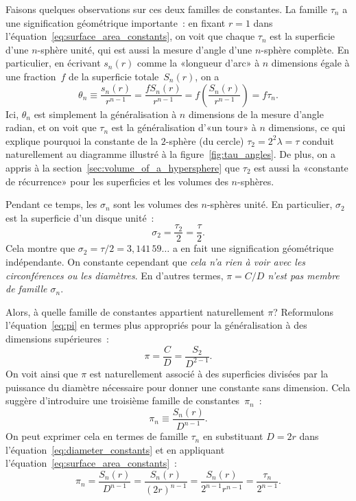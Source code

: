 Faisons quelques observations sur ces deux familles de constantes. La
famille $\tau_n$ a une signification géométrique importante~: en fixant $r=1$
dans l'équation~\eqref{eq:surface_area_constants}, on voit que chaque $\tau_n$
est la superficie d'une $n$-sphère unité, qui est aussi la mesure d'angle d'une
$n$-sphère complète. En particulier, en écrivant $s_n(r)$ comme la «\ns longueur
d'arc\ns » à $n$ dimensions égale à une fraction~$f$ de la superficie
totale~$S_n(r)$, on a
\[
\theta_n \equiv \frac{s_n(r)}{r^{n-1}} = \frac{f S_n(r)}{r^{n-1}} = f\left(\frac{S_n(r)}{r^{n-1}}\right) = f\tau_n.
\]
Ici, $\theta_n$ est simplement la généralisation à $n$ dimensions de la mesure
d'angle radian, et on voit que $\tau_n$ est la généralisation d'«\ns un tour\ns » à
$n$ dimensions, ce qui explique pourquoi la constante de la $2$-sphère (du
cercle) $\tau_2 = 2^2 \lambda = \tau$ conduit naturellement au diagramme
illustré à la figure~\ref{fig:tau_angles}. De plus, on a appris à la
section~\ref{sec:volume_of_a_hypersphere} que $\tau_2$ est aussi la «\ns constante
de récurrence\ns » pour les superficies et les volumes des $n$-sphères.

Pendant ce temps, les $\sigma_n$ sont les volumes des $n$-sphères unité. En
particulier, $\sigma_2$ est la superficie d'un disque unité~:
\[
\sigma_2 = \frac{\tau_2}{2} = \frac{\tau}{2}.
\]
Cela montre que $\sigma_2 = \tau/2 = 3{,}141\,59\ldots$ a en fait une
signification géométrique indépendante. On constante cependant que \emph{cela
n'a rien à voir avec les circonférences ou les diamètres}. En d'autres termes,
\emph{$\pi = C/D$ n'est pas membre de famille $\sigma_n$}.

Alors, à quelle famille de constantes appartient naturellement $\pi$\ns?
Reformulons l'équation~\eqref{eq:pi} en termes plus appropriés pour la
généralisation à des dimensions supérieures~:
\[
\pi = \frac{C}{D} = \frac{S_2}{D^{2-1}}.
\]
On voit ainsi que $\pi$ est naturellement associé à des superficies divisées par
la puissance du diamètre nécessaire pour donner une constante sans dimension.
Cela suggère d'introduire une troisième famille de constantes~$\pi_n$~:
\begin{equation}
\label{eq:diameter_constants}
\pi_n \equiv \frac{S_n(r)}{D^{n-1}}.
\end{equation}
On peut exprimer cela en termes de famille $\tau_n$ en substituant $D = 2r$ dans
l'équation~\eqref{eq:diameter_constants} et en appliquant
l'équation~\eqref{eq:surface_area_constants}~:
\[
\pi_n = \frac{S_n(r)}{D^{n-1}} = \frac{S_n(r)}{(2r)^{n-1}} =
\frac{S_n(r)}{2^{n-1}r^{n-1}} = \frac{\tau_n}{2^{n-1}}.
\]


